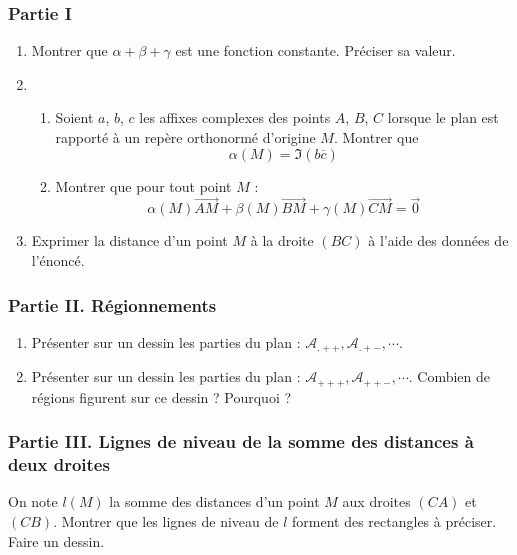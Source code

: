 \subsubsection*{Partie I}
\begin{enumerate}
\item Montrer que $\alpha + \beta +\gamma$ est une fonction constante. Préciser sa valeur.
\item \begin{enumerate}
\item Soient $a$, $b$, $c$ les affixes complexes des points $A$, $B$, $C$ lorsque le plan est rapporté à un repère orthonormé d'origine $M$. Montrer que 
\[\alpha(M)=\Im (b\overline{c})\]
\item Montrer que pour tout point $M$ :
\[\alpha(M)\overrightarrow{AM}+\beta(M)\overrightarrow{BM}+\gamma(M)\overrightarrow{CM}=\overrightarrow{0}\]
\end{enumerate}
\item Exprimer la distance d'un point $M$ à la droite $(BC)$ à l'aide des données de l'énoncé.
\end{enumerate}

\subsubsection*{Partie II. Régionnements}
\begin{enumerate}
\item Présenter sur un dessin les parties du plan : $\mathcal{A}_{.++}, \mathcal{A}_{.+-}, \cdots $.
\item Présenter sur un dessin les parties du plan : $\mathcal{A}_{+++}, \mathcal{A}_{++-}, \cdots $. Combien de régions figurent sur ce dessin ? Pourquoi ?
\end{enumerate}

\subsubsection*{Partie III. Lignes de niveau de la somme des distances à deux droites}
On note $l(M)$ la somme des distances d'un point $M$ aux droites $(CA)$ et $(CB)$.\newline
Montrer que les lignes de niveau de $l$ forment des rectangles à préciser. Faire un dessin.

